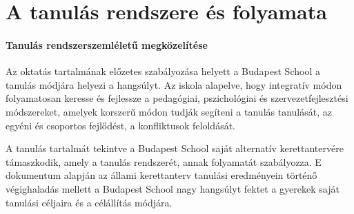 \section{A tanulás rendszere és folyamata}

\paragraph{Tanulás rendszerszemléletű megközelítése}
Az oktatás tartalmának előzetes szabályozása helyett a Budapest School a tanulás módjára helyezi a hangsúlyt. Az iskola alapelve, hogy integratív módon folyamatosan keresse és fejlessze a pedagógiai, pszichológiai és szervezetfejlesztési módszereket, amelyek korszerű módon tudják segíteni a tanulás tanulását, az egyéni és csoportos fejlődést, a konfliktusok feloldását.

A tanulás tartalmát tekintve a Budapest School saját alternatív kerettantervére támaszkodik, amely a tanulás rendszerét, annak folyamatát szabályozza. E dokumentum alapján az állami kerettanterv tanulási eredményein történő végighaladás mellett a Budapest School nagy hangsúlyt fektet a gyerekek saját tanulási céljaira és a célállítás módjára.